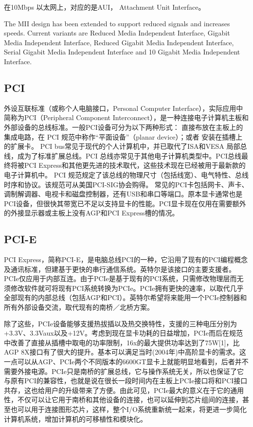 在10Mbps 以太网上，对应的是AUI， Attachment Unit Interface。

The MII design has been extended to support reduced signals and increases speeds. Current variants are Reduced Media Independent Interface, Gigabit Media Independent Interface, Reduced Gigabit Media Independent Interface, Serial Gigabit Media Independent Interface and 10 Gigabit Media Independent Interface.

\subsection{PCI}
外设互联标准（或称个人电脑接口，Personal Computer Interface），实际应用中简称为PCI（Peripheral Component Interconnect），是一种连接电子计算机主板和外部设备的总线标准。一般PCI设备可分为以下两种形式：
直接布放在主板上的集成电路，在 PCI 规范中称作“平面设备”（planar device）；或者
安装在插槽上的扩展卡。
PCI bus常见于现代的个人计算机中，并已取代了ISA和VESA 局部总线，成为了标准扩展总线。PCI 总线亦常见于其他电子计算机类型中。PCI总线最终将被PCI Express和其他更先进的技术取代，这些技术现在已经被用于最新款的电子计算机中。
PCI 规范规定了该总线的物理尺寸（包括线宽）、电气特性、总线时序和协议。该规范可从美国PCI-SIG协会购得。
常见的PCI卡包括网卡、声卡、调制解调器、电视卡和磁盘控制器，还有USB和串口等端口。原本显卡通常也是PCI设备，但很快其带宽已不足以支持显卡的性能。PCI显卡现在仅用在需要额外的外接显示器或主板上没有AGP和PCI Express槽的情况。

\subsection{PCI-E}
PCI Express，简称PCI-E，是电脑总线PCI的一种，它沿用了现有的PCI编程概念及通讯标准，但建基于更快的串行通信系统。英特尔是该接口的主要支援者。PCIe仅应用于内部互连。由于PCIe是基于现有的PCI系统，只需修改物理层而无须修改软件就可将现有PCI系统转换为PCIe。PCIe拥有更快的速率，以取代几乎全部现有的内部总线（包括AGP和PCI）。英特尔希望将来能用一个PCIe控制器和所有外部设备交流，取代现有的南桥／北桥方案。

除了这些，PCIe设备能够支援热拔插以及热交换特性，支援的三种电压分别为+3.3V、3.3Vaux以及+12V。考虑到现在显卡功耗的日益增加，PCIe而后在规范中改善了直接从插槽中取电的功率限制，16x的最大提供功率达到了75W[1]，比AGP 8X接口有了很大的提升。基本可以满足当时(2004年)中高阶显卡的需求。这一点可以从AGP、PCIe两个不同版本的6600GT显卡上就能明显地看到，后者并不需要外接电源。PCIe只是南桥的扩展总线，它与操作系统无关，所以也保证了它与原有PCI的兼容性，也就是说在很长一段时间内在主板上PCIe接口将和PCI接口共存，这也给用户的升级带来了方便。由此可见，PCIe最大的意义在于它的通用性，不仅可以让它用于南桥和其他设备的连接，也可以延伸到芯片组间的连接，甚至也可以用于连接图形芯片，这样，整个I/O系统重新统一起来，将更进一步简化计算机系统，增加计算机的可移植性和模块化。


